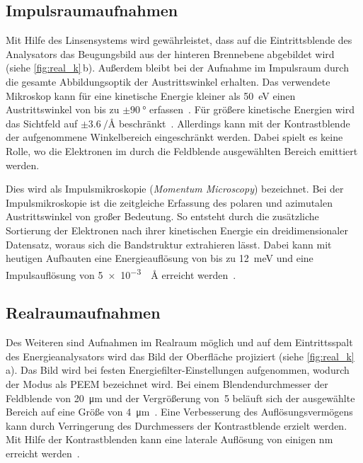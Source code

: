         \subsection{Impulsraumaufnahmen}
            Mit Hilfe des Linsensystems wird gewährleistet, dass auf die Eintrittsblende des Analysators das Beugungsbild aus der hinteren Brennebene abgebildet wird (siehe \autoref{fig:real_k}\,b).
            Außerdem bleibt bei der Aufnahme im Impulsraum durch die gesamte Abbildungsoptik der Austrittswinkel erhalten.
            Das verwendete Mikroskop kann für eine kinetische Energie kleiner als \SI{50}{\electronvolt} einen Austrittswinkel von bis zu $\pm\SI{90}{\degree}$ erfassen~\cite{SPECS-MM}.
            Für größere kinetische Energien wird das Sichtfeld auf $\pm\SI[per-mode=reciprocal]{3.6}{\per\angstrom}$ beschränkt~\cite{SPECS-MM}.
            Allerdings kann mit der Kontrastblende der aufgenommene Winkelbereich eingeschränkt werden.
            Dabei spielt es keine Rolle, wo die Elektronen im durch die Feldblende ausgewählten Bereich emittiert werden.

            Dies wird als Impulsmikroskopie (\textit{Momentum Microscopy}) bezeichnet.
            Bei der Impulsmikroskopie ist die zeitgleiche Erfassung des polaren und azimutalen Austrittswinkel von großer Bedeutung. 
            So entsteht durch die zusätzliche Sortierung der Elektronen nach ihrer kinetischen Energie ein dreidimensionaler Datensatz, woraus sich die Bandstruktur extrahieren lässt.
            Dabei kann mit heutigen Aufbauten eine Energieauflösung von bis zu \SI{12}{\milli\electronvolt} und eine Impulsauflösung von \SI[per-mode=reciprocal]{5e-3}{\per\angstrom} erreicht werden~\cite{suga_photoelectron_2021}.

        \subsection{Realraumaufnahmen}
            Des Weiteren sind Aufnahmen im Realraum möglich und auf dem Eintrittsspalt des Energieanalysators wird das Bild der Oberfläche projiziert (siehe \autoref{fig:real_k}\,a).
            Das Bild wird bei festen Energiefilter-Einstellungen aufgenommen, wodurch der Modus als PEEM bezeichnet wird.
            Bei einem Blendendurchmesser der Feldblende von \SI{20}{\micro\meter} und der Vergrößerung von~\num{5} beläuft sich der ausgewählte Bereich auf eine Größe von \SI{4}{\micro\meter}~\cite{SPECS-MM}.
            Eine Verbesserung des Auflösungsvermögens kann durch Verringerung des Durchmessers der Kontrastblende erzielt werden.
            Mit Hilfe der Kontrastblenden kann eine laterale Auflösung von einigen \si{\nano\meter} erreicht werden~\cite{locatelli_chemical_2015}. 


